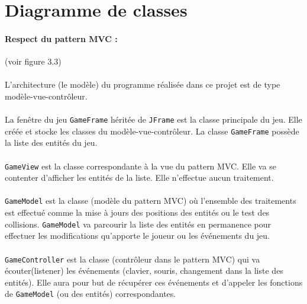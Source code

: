 \documentclass[a4paper,12pt]{report}
\begin{document}
\section{Diagramme de classes}

\paragraph{Respect du pattern MVC :}(voir figure 3.3)

\paragraph{}L'architecture (le modèle) du programme réalisée dans ce projet est de type modèle-vue-contrôleur.

\paragraph{}La fenêtre du jeu \verb+GameFrame+ héritée de \verb+JFrame+ est la classe principale du jeu. Elle créée et  stocke les classes du modèle-vue-contrôleur. La classe \verb+GameFrame+ possède la liste des entités du jeu.  

\paragraph{}\verb+GameView+ est la classe correspondante à la vue du pattern MVC. Elle va se contenter d'afficher les entités de la liste. Elle n'effectue aucun traitement.

\paragraph{}\verb+GameModel+ est la classe (modèle du pattern MVC) où l'ensemble des traitements est effectué comme la mise à jours des positions des entités ou le test des collisions. \verb+GameModel+ va parcourir la liste des entités en permanence pour effectuer les modifications qu'apporte le joueur ou les événements du jeu.

\paragraph{}\verb+GameController+ est la classe (contrôleur dans le pattern MVC) qui va écouter(listener) les événements (clavier, souris, changement dans la liste des entités). Elle aura pour but de récupérer ces événements et d'appeler les fonctions de \verb+GameModel+ (ou des entités) correspondantes.
\end{document}
